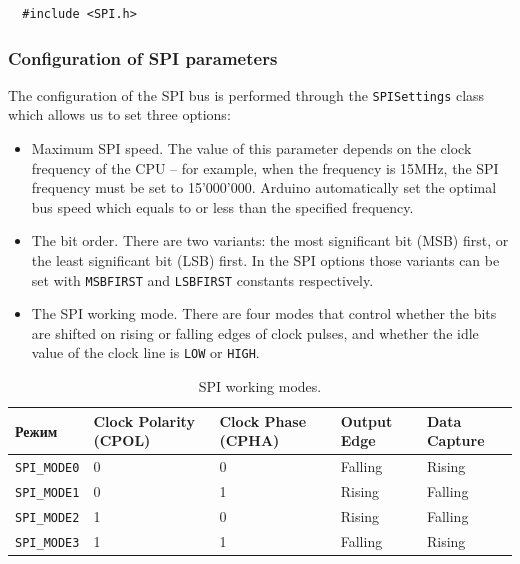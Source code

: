 \documentclass[../sparc.tex]{subfiles}
\begin{document}
\begin{verbatim}
  #include <SPI.h>
\end{verbatim}

\subsubsection{Configuration of SPI parameters}

The configuration of the SPI bus is performed through the
\texttt{SPISettings} class which allows us to set three options:

\begin{itemize}
\item Maximum SPI speed.  The value of this parameter depends on the clock
  frequency of the CPU -- for example, when the frequency is 15MHz, the SPI
  frequency must be set to 15'000'000.  Arduino automatically set the optimal
  bus speed which equals to or less than the specified frequency.
\item The bit order.  There are two variants: the most significant bit (MSB)
  first, or the least significant bit (LSB) first.  In the SPI options those
  variants can be set with \texttt{MSBFIRST} and
  \texttt{LSBFIRST} constants respectively.
\item The SPI working mode.  There are four modes that control whether the bits
  are shifted on rising or falling edges of clock pulses, and whether the idle
  value of the clock line is \texttt{LOW} or \texttt{HIGH}.
\end{itemize}

\begin{table}[H]
  \small
  \centering
  \begin{tabular}{ | m{1.75cm} | m{1cm} | m{1cm} | m{1cm} | m{1cm} | }
    \hline
    \textbf{Режим}
    & \textbf{Clock Polarity (CPOL)}
    & \textbf{Clock Phase (CPHA)}
    & \textbf{Output Edge}
    & \textbf{Data Capture} \\
    \hline
    \texttt{SPI\_MODE0} & 0 & 0 & Falling & Rising \\
    \hline
    \texttt{SPI\_MODE1} & 0 & 1 & Rising & Falling \\
    \hline
    \texttt{SPI\_MODE2} & 1 & 0 & Rising & Falling \\
    \hline
    \texttt{SPI\_MODE3} & 1 & 1 & Falling & Rising \\
    \hline
  \end{tabular}
  \caption{SPI working modes.}
  \label{table:spi-modes}
\end{table}
\end{document}
